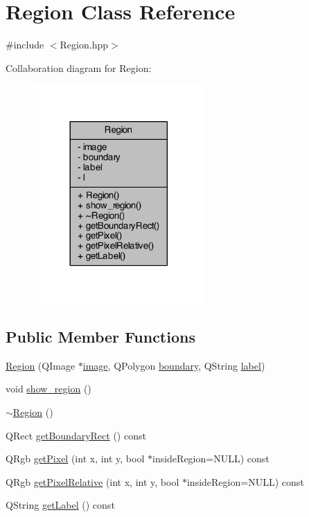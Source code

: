 \hypertarget{class_region}{\section{Region Class Reference}
\label{class_region}
}


{\ttfamily \#include $<$Region.\+hpp$>$}



Collaboration diagram for Region\+:
\nopagebreak
\begin{figure}[H]
\begin{center}
\leavevmode
\includegraphics[width=185pt]{class_region__coll__graph}
\end{center}
\end{figure}
\subsection*{Public Member Functions}
\begin{DoxyCompactItemize}
\item 
\hyperlink{class_region_a0e9c8974b3be20ce12a4b823f9f3f636}{Region} (Q\+Image $\ast$\hyperlink{class_region_a090b8bc9a8c73f8f874d8d439a0843be}{image}, Q\+Polygon \hyperlink{class_region_a4a59ef37013f3a6515a79317b0f0b4c0}{boundary}, Q\+String \hyperlink{class_region_afcc063386e02be883d71eaf5bcef2a55}{label})
\item 
void \hyperlink{class_region_ad2572028c1a4653a14dbfb1b622aa03e}{show\+\_\+region} ()
\item 
\hyperlink{class_region_a3c3670fff78f7511d156e3b2f0bc6266}{$\sim$\+Region} ()
\item 
Q\+Rect \hyperlink{class_region_a12c653b5aa89c899e2680c9dc1bbf46d}{get\+Boundary\+Rect} () const 
\item 
Q\+Rgb \hyperlink{class_region_acc0edaac14854ccc448f419844a722bf}{get\+Pixel} (int x, int y, bool $\ast$inside\+Region=N\+U\+L\+L) const 
\item 
Q\+Rgb \hyperlink{class_region_a421786f57555f6348ece3fa33eb86594}{get\+Pixel\+Relative} (int x, int y, bool $\ast$inside\+Region=N\+U\+L\+L) const 
\item 
Q\+String \hyperlink{class_region_a69d5acb5d1d81b50f225817217f60fdd}{get\+Label} () const 
\end{DoxyCompactItemize}
